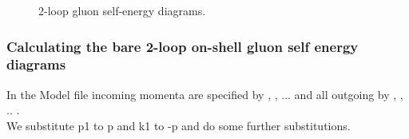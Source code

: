 \begin{figure}[ht]
\begin{center}
\caption{2-loop gluon self-energy diagrams.}
\end{center}
\end{figure}

\subsubsection*{Calculating the bare 2-loop on-shell gluon self energy diagrams}

In the Model file incoming momenta are specified by , , ... and all outgoing
by , , .. .\\
We substitute p1 to p and k1 to -p and do some further substitutions.

